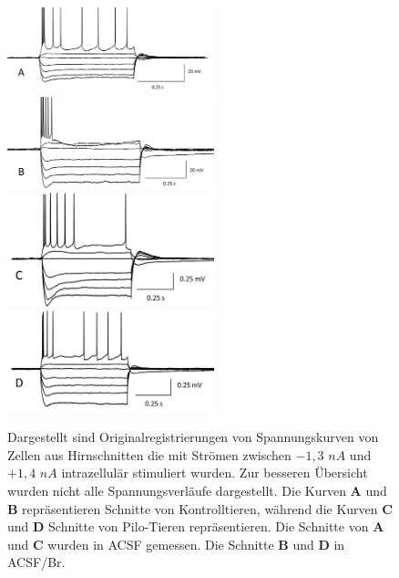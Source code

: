 \documentclass[a4paper,11pt]{report}
\begin{document}
{\begin{figure} [H]
\begin{center}
\includegraphics[width=6cm]{Abbildungen/membraneigenschaften/membraneigenschaften_k_c}
\includegraphics[width=6cm]{Abbildungen/membraneigenschaften/membraneigenschaften_k_br}
\includegraphics[width=6cm]{Abbildungen/membraneigenschaften/membraneigenschaften_p_c}
\includegraphics[width=6cm]{Abbildungen/membraneigenschaften/membraneigenschaften_p_br}

\caption{Dargestellt sind Originalregistrierungen von Spannungskurven von Zellen aus Hirnschnitten die mit Strömen zwischen $-1,3$ $nA$ und $+1,4$ $nA$ intrazellulär stimuliert wurden. Zur besseren Übersicht wurden nicht alle Spannungsverläufe dargestellt. Die Kurven \textbf{A} und \textbf{B} repräsentieren Schnitte von Kontrolltieren, während die Kurven \textbf{C} und \textbf{D} Schnitte von Pilo-Tieren repräsentieren. Die Schnitte von \textbf{A} und \textbf{C} wurden in ACSF gemessen. Die Schnitte \textbf{B} und \textbf{D} in ACSF/Br.}
\end{center}
\end{figure}



}
\end{document}
